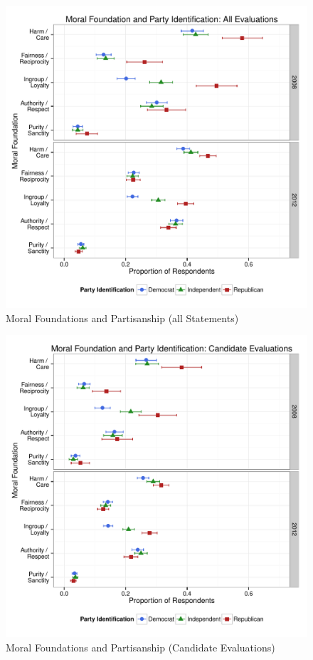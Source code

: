 \documentclass[12pt]{article}
\begin{document}
\begin{figure}[ht]\centering
\includegraphics[scale=.4]{../calc/fig/a1_mft_pid.pdf}
\caption{Moral Foundations and Partisanship (all Statements)}\label{fig:a1_mft_pid}
\end{figure}

\begin{figure}[ht]\centering
\includegraphics[scale=.4]{../calc/fig/a2_mft_pid_ca.pdf}
\caption{Moral Foundations and Partisanship (Candidate Evaluations)}\label{fig:a2_mft_pid_ca}
\end{figure}
\end{document}
